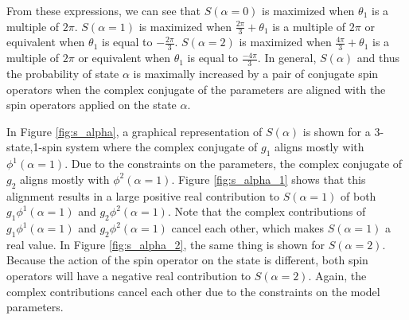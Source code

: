 \noindent 
From these expressions, we can see that $S(\alpha=0)$ is maximized when $\theta_1$ is a multiple of $2\pi$. $S(\alpha=1)$ is maximized when $\frac{2\pi}{3} + \theta_1$ is a multiple of $2\pi$ or equivalent when $\theta_1$ is equal to $-\frac{2\pi}{3}$.
$S(\alpha=2)$ is maximized when $\frac{4\pi}{3} + \theta_1$ is a multiple of $2\pi$ or equivalent when $\theta_1$ is equal to $\frac{-4\pi}{3}$.
In general, $S(\alpha)$ and thus the probability of state $\alpha$ is maximally increased by a pair of conjugate spin operators when the complex conjugate of the parameters are aligned with the spin operators applied on the state $\alpha$.

\noindent
In Figure \ref{fig:s_alpha}, a graphical representation of $S({\alpha})$ is shown for a 3-state,1-spin system where the complex conjugate of $g_1$ aligns mostly with $\phi^1(\alpha=1)$.
Due to the constraints on the parameters, the complex conjugate of $g_2$ aligns mostly with $\phi^2(\alpha=1)$.
Figure \ref{fig:s_alpha_1} shows that this alignment results in a large positive real contribution to $S(\alpha = 1)$ of both $g_1 \phi^1(\alpha=1)$ and $g_2 \phi^2(\alpha=1)$. 
Note that the complex contributions of $g_1 \phi^1(\alpha=1)$ and $g_2 \phi^2(\alpha=1)$ cancel each other, which makes $S(\alpha=1)$ a real value.
In Figure \ref{fig:s_alpha_2}, the same thing is shown for $S(\alpha=2)$. Because the action of the spin operator on the state is different, both spin operators will have a negative real contribution to $S(\alpha=2)$.
Again, the complex contributions cancel each other due to the constraints on the model parameters.

